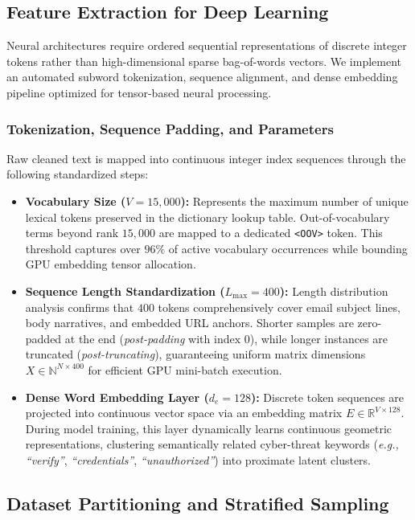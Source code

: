 \documentclass[conference]{IEEEtran}
\begin{document}
\subsection{Feature Extraction for Deep Learning}
Neural architectures require ordered sequential representations of discrete integer tokens rather than high-dimensional sparse bag-of-words vectors. We implement an automated subword tokenization, sequence alignment, and dense embedding pipeline optimized for tensor-based neural processing.

\subsubsection{Tokenization, Sequence Padding, and Parameters}
Raw cleaned text is mapped into continuous integer index sequences through the following standardized steps:

\begin{itemize}
    \item \textbf{Vocabulary Size ($V = 15,000$):} Represents the maximum number of unique lexical tokens preserved in the dictionary lookup table. Out-of-vocabulary terms beyond rank $15,000$ are mapped to a dedicated \texttt{<OOV>} token. This threshold captures over $96\%$ of active vocabulary occurrences while bounding GPU embedding tensor allocation.

    \item \textbf{Sequence Length Standardization ($L_{\max} = 400$):} Length distribution analysis confirms that $400$ tokens comprehensively cover email subject lines, body narratives, and embedded URL anchors. Shorter samples are zero-padded at the end (\textit{post-padding} with $\text{index } 0$), while longer instances are truncated (\textit{post-truncating}), guaranteeing uniform matrix dimensions $X \in \mathbb{N}^{N \times 400}$ for efficient GPU mini-batch execution.

    \item \textbf{Dense Word Embedding Layer ($d_e = 128$):} Discrete token sequences are projected into continuous vector space via an embedding matrix $E \in \mathbb{R}^{V \times 128}$. During model training, this layer dynamically learns continuous geometric representations, clustering semantically related cyber-threat keywords (\textit{e.g.,} \textit{``verify''}, \textit{``credentials''}, \textit{``unauthorized''}) into proximate latent clusters.
\end{itemize}


\subsection{Dataset Partitioning and Stratified Sampling}
\end{document}
